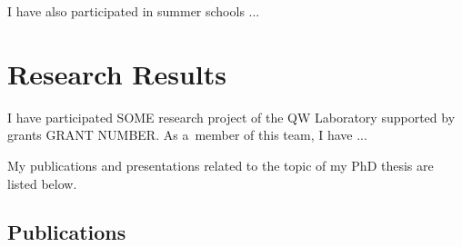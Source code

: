 \documentclass[11pt,a4paper]{report}
\begin{document}
I have also participated in summer schools ...

\section{Research Results}

I have participated  SOME research project of the QW Laboratory supported by grants
GRANT NUMBER. As a~member of this team, I have ...

 My publications and presentations related
to the topic of my PhD thesis are listed below.

\subsection*{Publications}
\end{document}
